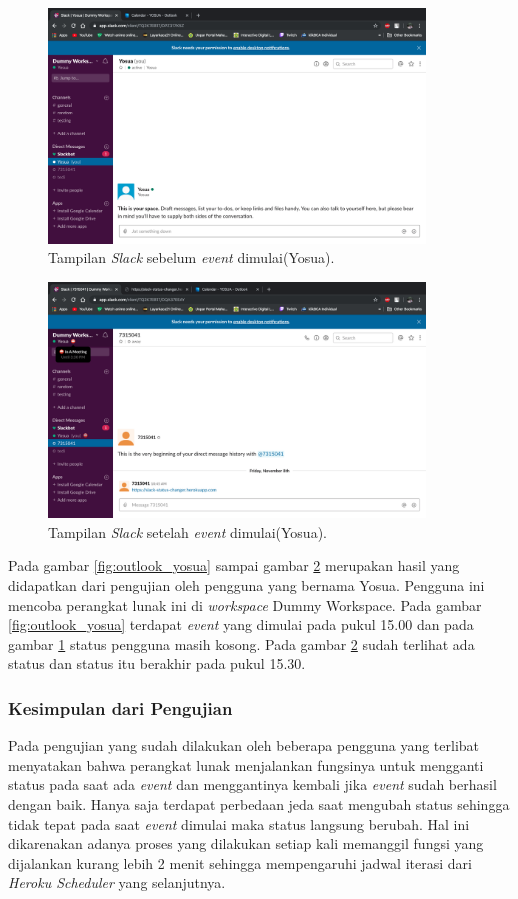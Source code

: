 \begin{figure}[h]
  \includegraphics[width=10cm]{./Gambar/PengujianYosua/Slack_Before.png}
  \centering
  \caption{Tampilan \textit{Slack} sebelum \textit{event} dimulai(Yosua).}
  \label{fig:slack_before_yosua}
\end{figure}

\begin{figure}[h]
  \includegraphics[width=10cm]{./Gambar/PengujianYosua/Slack_After.png}
  \centering
  \caption{Tampilan \textit{Slack} setelah \textit{event} dimulai(Yosua).}
  \label{fig:slack_after_yosua}
\end{figure}

Pada gambar \ref{fig:outlook_yosua} sampai gambar \ref{fig:slack_after_yosua} merupakan hasil yang didapatkan dari pengujian oleh pengguna yang bernama Yosua. Pengguna ini mencoba perangkat lunak ini di \textit{workspace} Dummy Workspace. Pada gambar \ref{fig:outlook_yosua} terdapat \textit{event} yang dimulai pada pukul 15.00 dan pada gambar \ref{fig:slack_before_yosua} status pengguna masih kosong. Pada gambar \ref{fig:slack_after_yosua} sudah terlihat ada status dan status itu berakhir pada pukul 15.30. 
\clearpage

\subsubsection{Kesimpulan dari Pengujian}
Pada pengujian yang sudah dilakukan oleh beberapa pengguna yang terlibat menyatakan bahwa perangkat lunak menjalankan fungsinya untuk mengganti status pada saat ada \textit{event} dan menggantinya kembali jika \textit{event} sudah berhasil dengan baik. Hanya saja terdapat perbedaan jeda saat mengubah status sehingga tidak tepat pada saat \textit{event} dimulai maka status langsung berubah. Hal ini dikarenakan adanya proses yang dilakukan setiap kali memanggil fungsi yang dijalankan kurang lebih 2 menit sehingga mempengaruhi jadwal iterasi dari \textit{Heroku Scheduler} yang selanjutnya. 